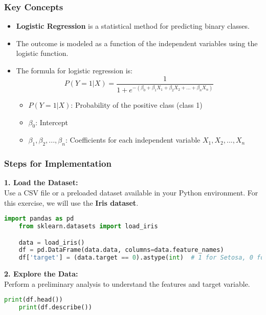 \documentclass[aspectratio=169]{beamer}
\begin{document}
\begin{frame}
    \frametitle{Key Concepts}
    \begin{itemize}
        \item \textbf{Logistic Regression} is a statistical method for predicting binary classes.
        \item The outcome is modeled as a function of the independent variables using the logistic function.
        \item The formula for logistic regression is:
        \begin{equation}
            P(Y=1|X) = \frac{1}{1 + e^{-(\beta_0 + \beta_1 X_1 + \beta_2 X_2 + ... + \beta_n X_n)}}
        \end{equation}
        \begin{itemize}
            \item \( P(Y=1|X) \): Probability of the positive class (class 1)
            \item \( \beta_0 \): Intercept
            \item \( \beta_1, \beta_2, ..., \beta_n \): Coefficients for each independent variable \( X_1, X_2, ..., X_n \)
        \end{itemize}
    \end{itemize}
\end{frame}

\begin{frame}[fragile]
    \frametitle{Steps for Implementation}
    \textbf{1. Load the Dataset:} \\
    Use a CSV file or a preloaded dataset available in your Python environment. For this exercise, we will use the \textbf{Iris dataset}.
    \begin{lstlisting}[language=Python]
    import pandas as pd
    from sklearn.datasets import load_iris

    data = load_iris()
    df = pd.DataFrame(data.data, columns=data.feature_names)
    df['target'] = (data.target == 0).astype(int)  # 1 for Setosa, 0 for others
    \end{lstlisting}
    
    \textbf{2. Explore the Data:} \\
    Perform a preliminary analysis to understand the features and target variable.
    \begin{lstlisting}[language=Python]
    print(df.head())
    print(df.describe())
    \end{lstlisting}
\end{frame}
\end{document}
